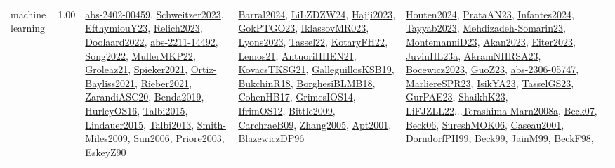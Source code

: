 {\begin{longtable}{p{3cm}r>{\raggedright\arraybackslash}p{6cm}>{\raggedright\arraybackslash}p{6cm}>{\raggedright\arraybackslash}p{8cm}}
\index{machine learning}\index{Algorithms!machine learning}machine learning &  1.00 & \hyperref[detail:abs-2402-00459]{abs-2402-00459}, \hyperref[detail:Schweitzer2023]{Schweitzer2023}, \hyperref[detail:EfthymiouY23]{EfthymiouY23}, \hyperref[detail:Relich2023]{Relich2023}, \hyperref[detail:Doolaard2022]{Doolaard2022}, \hyperref[detail:abs-2211-14492]{abs-2211-14492}, \hyperref[detail:Song2022]{Song2022}, \hyperref[detail:MullerMKP22]{MullerMKP22}, \hyperref[detail:Groleaz21]{Groleaz21}, \hyperref[detail:Spieker2021]{Spieker2021}, \hyperref[detail:Ortiz-Bayliss2021]{Ortiz-Bayliss2021}, \hyperref[detail:Rieber2021]{Rieber2021}, \hyperref[detail:ZarandiASC20]{ZarandiASC20}, \hyperref[detail:Benda2019]{Benda2019}, \hyperref[detail:HurleyOS16]{HurleyOS16}, \hyperref[detail:Talbi2015]{Talbi2015}, \hyperref[detail:Lindauer2015]{Lindauer2015}, \hyperref[detail:Talbi2013]{Talbi2013}, \hyperref[detail:Smith-Miles2009]{Smith-Miles2009}, \hyperref[detail:Sun2006]{Sun2006}, \hyperref[detail:Priore2003]{Priore2003}, \hyperref[detail:EskeyZ90]{EskeyZ90} & \hyperref[detail:Barral2024]{Barral2024}, \hyperref[detail:LiLZDZW24]{LiLZDZW24}, \hyperref[detail:Hajji2023]{Hajji2023}, \hyperref[detail:GokPTGO23]{GokPTGO23}, \hyperref[detail:IklassovMR023]{IklassovMR023}, \hyperref[detail:Lyons2023]{Lyons2023}, \hyperref[detail:Tassel22]{Tassel22}, \hyperref[detail:KotaryFH22]{KotaryFH22}, \hyperref[detail:Lemos21]{Lemos21}, \hyperref[detail:AntuoriHHEN21]{AntuoriHHEN21}, \hyperref[detail:KovacsTKSG21]{KovacsTKSG21}, \hyperref[detail:GalleguillosKSB19]{GalleguillosKSB19}, \hyperref[detail:BukchinR18]{BukchinR18}, \hyperref[detail:BorghesiBLMB18]{BorghesiBLMB18}, \hyperref[detail:CohenHB17]{CohenHB17}, \hyperref[detail:GrimesIOS14]{GrimesIOS14}, \hyperref[detail:IfrimOS12]{IfrimOS12}, \hyperref[detail:Bittle2009]{Bittle2009}, \hyperref[detail:CarchraeB09]{CarchraeB09}, \hyperref[detail:Zhang2005]{Zhang2005}, \hyperref[detail:Apt2001]{Apt2001}, \hyperref[detail:BlazewiczDP96]{BlazewiczDP96} & \hyperref[detail:Houten2024]{Houten2024}, \hyperref[detail:PrataAN23]{PrataAN23}, \hyperref[detail:Infantes2024]{Infantes2024}, \hyperref[detail:Tayyab2023]{Tayyab2023}, \hyperref[detail:Mehdizadeh-Somarin23]{Mehdizadeh-Somarin23}, \hyperref[detail:MontemanniD23]{MontemanniD23}, \hyperref[detail:Akan2023]{Akan2023}, \hyperref[detail:Eiter2023]{Eiter2023}, \hyperref[detail:JuvinHL23a]{JuvinHL23a}, \hyperref[detail:AkramNHRSA23]{AkramNHRSA23}, \hyperref[detail:Bocewicz2023]{Bocewicz2023}, \hyperref[detail:GuoZ23]{GuoZ23}, \hyperref[detail:abs-2306-05747]{abs-2306-05747}, \hyperref[detail:MarliereSPR23]{MarliereSPR23}, \hyperref[detail:IsikYA23]{IsikYA23}, \hyperref[detail:TasselGS23]{TasselGS23}, \hyperref[detail:GurPAE23]{GurPAE23}, \hyperref[detail:ShaikhK23]{ShaikhK23}, \hyperref[detail:LiFJZLL22]{LiFJZLL22}...\hyperref[detail:Terashima-Marn2008a]{Terashima-Marn2008a}, \hyperref[detail:Beck07]{Beck07}, \hyperref[detail:Beck06]{Beck06}, \hyperref[detail:SureshMOK06]{SureshMOK06}, \hyperref[detail:Caseau2001]{Caseau2001}, \hyperref[detail:DorndorfPH99]{DorndorfPH99}, \hyperref[detail:Beck99]{Beck99}, \hyperref[detail:JainM99]{JainM99}, \hyperref[detail:BeckF98]{BeckF98}, 
\end{longtable}}
